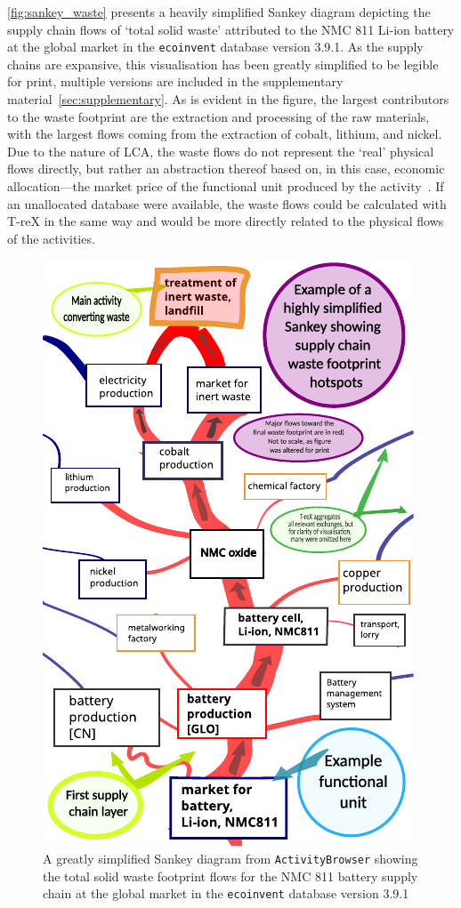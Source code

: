 \documentclass[a4paper,fleqn]{cas-dc}
\renewcommand{\texttt}[1]{{\ttfamily\small\nolinkurl{#1}}}
\begin{document}
\autoref{fig:sankey_waste} presents a heavily simplified Sankey diagram depicting the supply chain flows of `total solid waste' attributed to the NMC 811 Li-ion battery at the global market in the \texttt{ecoinvent} database version 3.9.1. As the supply chains are expansive, this visualisation has been greatly simplified to be legible for print, multiple versions are included in the supplementary material~\autoref{sec:supplementary}. As is evident in the figure, the largest contributors to the waste footprint are the extraction and processing of the raw materials, with the largest flows coming from the extraction of cobalt, lithium, and nickel. Due to the nature of LCA, the waste flows do not represent the `real' physical flows directly, but rather an abstraction thereof based on, in this case, economic allocation---the market price of the functional unit produced by the activity~\citep{guinee2004economicallocation}. If an unallocated database were available, the waste flows could be calculated with T-reX in the same way and would be more directly related to the physical flows of the activities.

\begin{figure}
	\centering
	\includegraphics[width=0.9\columnwidth]{figures/T-reX_NMC811_WasteTotalSolid.pdf}
	\caption{A greatly simplified Sankey diagram from \texttt{ActivityBrowser} showing the total solid waste footprint flows for the NMC 811 battery supply chain at the global market in the \texttt{ecoinvent} database version 3.9.1}\label{fig:sankey_waste}
\end{figure}
\end{document}
